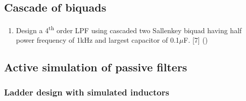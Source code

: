 \documentclass[12pt]{article}
\newcommand{\super}[1]{\textsuperscript{#1}}
\begin{document}
	\subsection{Cascade of biquads}
		\begin{enumerate}
			\item Design a 4\super{th} order LPF using cascaded two Sallenkey biquad having half power frequency of 1kHz and largest capacitor of 0.1$\mu$F. \hfill [7] ()\
		\end{enumerate}

	\subsection{Active simulation of passive filters}
		\subsubsection{Ladder design with simulated inductors}
\end{document}
